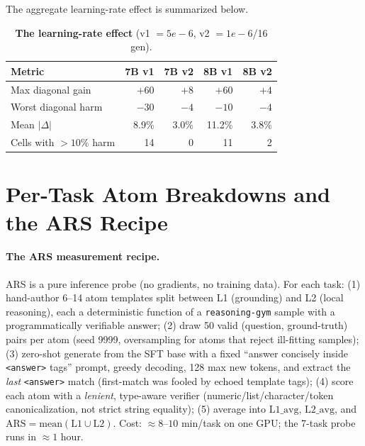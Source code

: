 \documentclass{article}
\begin{document}
The aggregate learning-rate effect is summarized below.

\begin{table}[h]
\centering\small
\caption{\textbf{The learning-rate effect} (v1 $=5{e}{-}6$, v2 $=1{e}{-}6$/16 gen).}
\begin{tabular}{lrrrr}
\toprule
Metric & 7B v1 & 7B v2 & 8B v1 & 8B v2\\
\midrule
Max diagonal gain      & $+60$ & $+8$  & $+60$ & $+4$\\
Worst diagonal harm    & $-30$ & $-4$  & $-10$ & $-4$\\
Mean $|\Delta|$        & 8.9\% & 3.0\% & 11.2\%& 3.8\%\\
Cells with $>10\%$ harm& 14    & 0     & 11    & 2\\
\bottomrule
\end{tabular}
\end{table}

\section{Per-Task Atom Breakdowns and the ARS Recipe}
\label{app:ars}
\paragraph{The ARS measurement recipe.} ARS is a pure inference probe (no gradients, no training
data). For each task: (1) hand-author 6--14 atom templates split between L1 (grounding) and L2
(local reasoning), each a deterministic function of a \texttt{reasoning-gym} sample with a
programmatically verifiable answer; (2) draw 50 valid (question, ground-truth) pairs per atom
(seed 9999, oversampling for atoms that reject ill-fitting samples); (3) zero-shot generate from
the SFT base with a fixed ``answer concisely inside \texttt{<answer>} tags'' prompt, greedy
decoding, 128 max new tokens, and extract the \emph{last} \texttt{<answer>} match (first-match was
fooled by echoed template tags); (4) score each atom with a \emph{lenient}, type-aware verifier
(numeric/list/character/token canonicalization, not strict string equality); (5) average into
$\mathrm{L1\_avg}$, $\mathrm{L2\_avg}$, and $\mathrm{ARS}=\mathrm{mean}(\mathrm{L1}\cup\mathrm{L2})$.
Cost: $\approx 8$--$10$ min/task on one GPU; the 7-task probe runs in $\approx 1$ hour.
\end{document}

